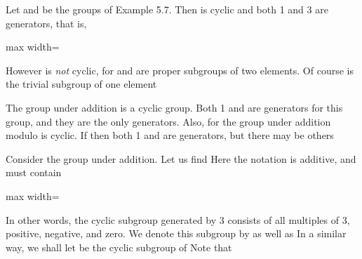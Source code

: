 \documentclass[11pt,oneside]{article}
\begin{document}
\begin{BookBody}
 Let  and  be the groups of Example 5.7. Then  is cyclic and both 1 and 3 are generators, that is,

\begin{center}\begin{adjustbox}{max width=\linewidth}\end{adjustbox}\end{center}

\noindent However is\textit{ not} cyclic, for  and  are proper subgroups of two elements. Of course is the trivial subgroup of one element\BookEnd{\blacktriangle}

 The group  under addition is a cyclic group. Both 1 and  are generators for this group, and they are the only generators. Also, for  the group  under addition modulo  is cyclic. If  then both 1 and  are generators, but there may be others\BookEnd{\blacktriangle}

 Consider the group  under addition. Let us find  Here the notation is additive, and \BookInline{\langle 3\rangle } must contain

\begin{center}\begin{adjustbox}{max width=\linewidth}\end{adjustbox}\end{center}

\noindent In other words, the cyclic subgroup generated by 3 consists of all multiples of 3, positive, negative, and zero. We denote this subgroup by  as well as  In a similar way, we shall let  be the cyclic subgroup  of  Note that \BookEnd{\blacktriangle}


\end{BookBody}
\end{document}
